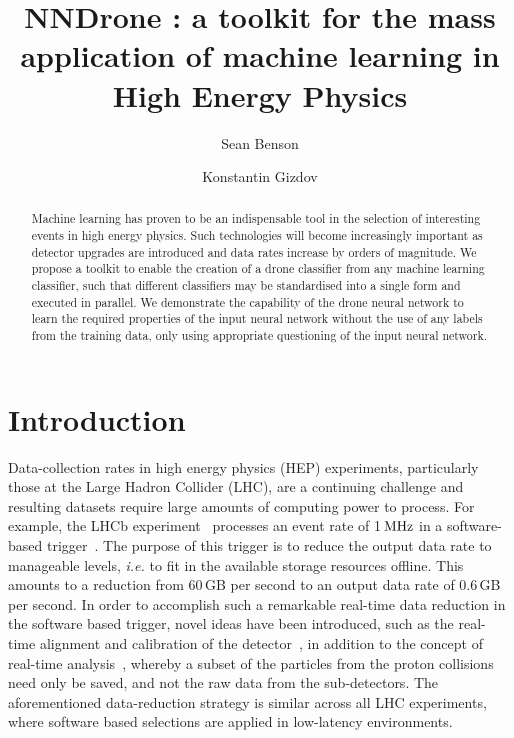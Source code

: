 \documentclass[final,5p,times,twocolumn]{elsarticle}
\def\lhcb {\mbox{LHCb}\xspace}
\def\mhz  {\ensuremath{{\rm \,MHz}}\xspace}
\newcommand{\ie}{\mbox{\itshape i.e.}\xspace}
\begin{document}

\begin{frontmatter}
\author[nl]{Sean Benson}
\author[uoe]{Konstantin Gizdov}
\address[nl]{Nikhef National Institute for Subatomic Physics, Amsterdam, The Netherlands}
\address[uoe]{School of Physics and Astronomy, University of Edinburgh, Edinburgh, United Kingdom}
\title{NNDrone : a toolkit for the mass application of machine learning in High Energy Physics}
\begin{abstract}
  \noindent
  Machine learning has proven to be an indispensable tool in the selection of
  interesting events in high energy physics. Such technologies will become increasingly
  important as detector upgrades are introduced and data rates increase by orders of magnitude.
  We propose a toolkit to enable the creation of a drone classifier from any machine learning
  classifier, such that different classifiers may be standardised into a single form and executed
  in parallel. We demonstrate the capability of the drone neural network
  to learn the required properties of the input neural network without
  the use of any labels from the training data, only using appropriate questioning of the input neural network.
\end{abstract}
\end{frontmatter}

\section{Introduction}
\label{sec:intro}

Data-collection rates in high energy physics (HEP) experiments, particularly those at the Large Hadron Collider (LHC),
are a continuing challenge and resulting datasets require large amounts of computing power to process.
For example, the \lhcb experiment~\cite{Alves:2008zz} processes an event rate of 1\mhz in a software-based
trigger~\cite{LHCb-DP-2014-002}. The purpose of this trigger is to reduce the output
data rate to manageable levels, \ie to fit in the available storage resources offline.
This amounts to a reduction from 60\,GB per second to an output data rate of 0.6\,GB per second.
In order to accomplish such a remarkable real-time data reduction in the software based trigger,
novel ideas have been introduced, such as the real-time alignment and calibration of the detector~\cite{Xu:2016mik},
in addition to the concept of real-time analysis~\cite{Aaij:2016rxn}, whereby a subset of the particles from the proton collisions need only
be saved, and not the raw data from the sub-detectors.
The aforementioned data-reduction strategy is similar across all LHC experiments, where
software based selections are applied in low-latency environments.
\end{document}
